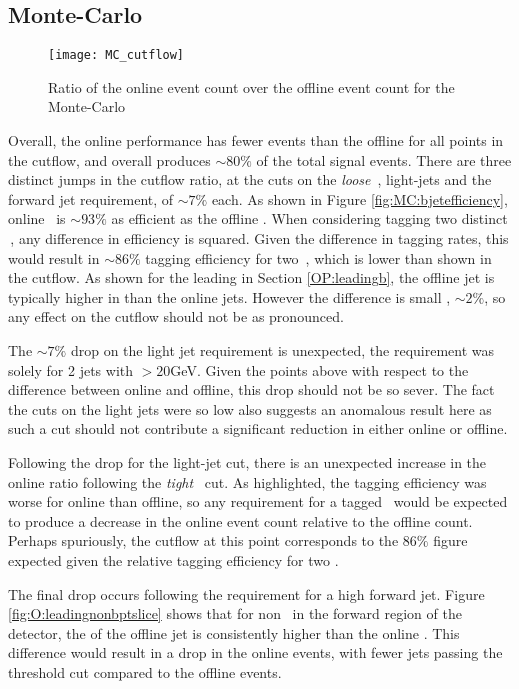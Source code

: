 	\subsection{Monte-Carlo}
		\begin{figure}[h]
			\centering
			\texttt{[image: MC\_cutflow]}
			\caption{Ratio of the online event count over the offline event count for the Monte-Carlo}
			\label{f:cutflowD}
		\end{figure}

	Overall, the online performance has fewer events than the offline for all points in the cutflow, and overall produces $\sim80\%$ of the total signal events. There are three distinct jumps in the cutflow ratio, at the cuts on the \textit{loose} \bjets\,, light-jets and the forward jet requirement, of $\sim7\%$ each. As shown in Figure \ref{fig:MC:bjetefficiency}, online \btag\, is $\sim93\%$ as efficient as the offline \btag. When considering tagging two distinct \bjets\,, any difference in efficiency is squared. Given the difference in tagging rates, this would result in $\sim86\%$ tagging efficiency for two \bjets\,, which is lower than shown in the cutflow. As shown for the leading \bjet in Section \ref{OP:leadingb}, the offline jet is typically higher in \pt than the online jets. However the difference is small , $\sim2\%$, so any effect on the cutflow should not be as pronounced.

	The $\sim7\%$ drop on the light jet requirement is unexpected, the requirement was solely for 2 jets with \pt$>20$GeV. Given the points above with respect to the \pt difference between online and offline, this drop should not be so sever. The fact the \pt cuts on the light jets were so low also suggests an anomalous result here as such a cut should not contribute a significant reduction in either online or offline.

	Following the drop for the light-jet cut, there is an unexpected increase in the online ratio following the \textit{tight} \btagging\, cut. As highlighted, the tagging efficiency was worse for online than offline, so any requirement for a tagged \bjet\, would be expected to produce a decrease in the online event count relative to the offline count. Perhaps spuriously, the cutflow at this point corresponds to the $86\%$ figure expected given the relative tagging efficiency for two \bjets.

	The final drop occurs following the requirement for a high \pt forward jet. Figure \ref{fig:O:leadingnonbptslice} shows that for non \bjets\, in the forward region of the detector, the \pt of the offline jet is consistently higher than the online \pt. This difference would result in a drop in the online events, with fewer jets passing the threshold \pt cut compared to the offline events.

